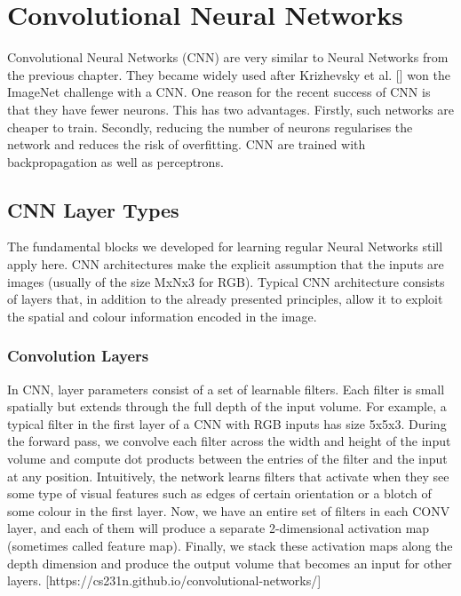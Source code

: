 \section{Convolutional Neural Networks}

Convolutional Neural Networks (CNN) are very similar to Neural Networks from the previous chapter. They became widely used after Krizhevsky et al. [] won the ImageNet challenge with a CNN. One reason for the recent success of CNN is that they have fewer neurons. This has two advantages. Firstly, such networks are cheaper to train. Secondly, reducing the number of neurons regularises the network and reduces the risk of overfitting. CNN are trained with backpropagation as well as perceptrons.  

\subsection{CNN Layer Types}
The fundamental blocks we developed for learning regular Neural Networks still apply here. CNN architectures make the explicit assumption that the inputs are images (usually of the size MxNx3 for RGB). Typical CNN architecture consists of layers that, in addition to the already presented principles, allow it to exploit the spatial and colour information encoded in the image.

\subsubsection{Convolution Layers}

In CNN, layer parameters consist of a set of learnable filters. Each filter is small spatially but extends through the full depth of the input volume. For example, a typical filter in the first layer of a CNN with RGB inputs has size 5x5x3. During the forward pass, we convolve each filter across the width and height of the input volume and compute dot products between the entries of the filter and the input at any position. Intuitively, the network learns filters that activate when they see some type of visual features such as edges of certain orientation or a blotch of some colour in the first layer. Now, we have an entire set of filters in each CONV layer, and each of them will produce a separate 2-dimensional activation map (sometimes called feature map). Finally, we stack these activation maps along the depth dimension and produce the output volume that becomes an input for other layers. [https://cs231n.github.io/convolutional-networks/]

